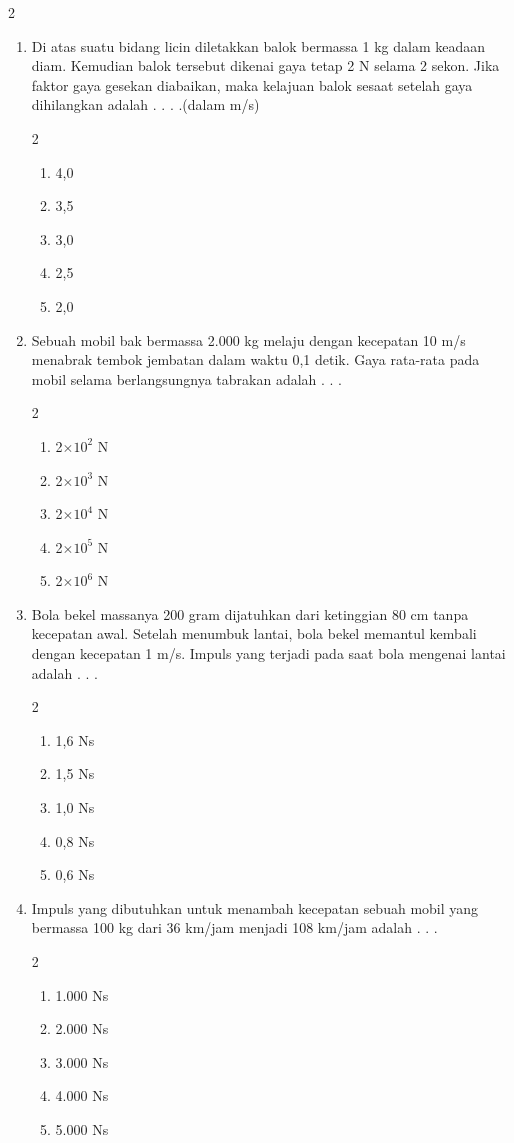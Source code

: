 \documentclass[11pt,a4paper]{extarticle}
\newcommand{\pilgani}[1]{                            \vspace{-0.3cm}\begin{multicols}{2}
 \begin{enumerate}[label=\Alph*., itemsep=0pt,topsep=0pt,leftmargin=*,align=Center]#1                     \end{enumerate}
 \phantom{ini cuma sapi, wedus, dan ayam}
 \end{multicols}}
\begin{document}
\begin{multicols*}{2}
\begin{enumerate}
\item Di atas suatu bidang licin diletakkan balok bermassa 1 kg dalam keadaan diam. Kemudian balok tersebut dikenai gaya tetap 2 N selama 2 sekon. Jika faktor gaya gesekan diabaikan, maka kelajuan balok sesaat setelah gaya dihilangkan adalah . . . .(dalam m/s)
\pilgani{
        \item 4,0
        \item 3,5
        \item 3,0
        \item 2,5
        \item 2,0}

\vspace{2cm}


\item Sebuah mobil bak bermassa 2.000 kg melaju dengan kecepatan 10 m/s menabrak tembok jembatan dalam waktu 0,1 detik. Gaya rata-rata pada mobil selama berlangsungnya tabrakan adalah . . .
\pilgani{
        \item 2$\times 10^2$ N
        \item 2$\times 10^3$ N
        \item 2$\times 10^4$ N
        \item 2$\times 10^5$ N
        \item 2$\times 10^6$ N
        }

\vspace{2cm}



\item Bola bekel massanya 200 gram dijatuhkan dari ketinggian 80 cm tanpa kecepatan awal. Setelah menumbuk lantai, bola bekel memantul kembali dengan kecepatan 1 m/s. Impuls yang terjadi pada saat bola mengenai lantai adalah . . . 
\pilgani{
        \item 1,6 Ns
        \item 1,5 Ns
        \item 1,0 Ns
        \item 0,8 Ns
        \item 0,6 Ns
        }
\vspace{2cm}


\item Impuls yang dibutuhkan untuk menambah kecepatan sebuah mobil yang bermassa 100 kg dari 36 km/jam menjadi 108 km/jam adalah . . .
\pilgani{
        \item 1.000 Ns
        \item 2.000 Ns
        \item 3.000 Ns
        \item 4.000 Ns
        \item 5.000 Ns
        }
\vspace{2cm}



\end{enumerate}
\end{multicols*}
\end{document}
